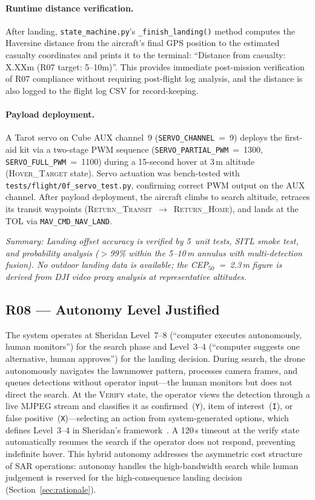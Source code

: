 \paragraph{Runtime distance verification.} After landing, \texttt{state\_machine.py}'s \texttt{\_finish\_landing()} method computes the Haversine distance from the aircraft's final GPS position to the estimated casualty coordinates and prints it to the terminal: ``Distance from casualty: X.XXm (R07 target: 5--10m)''. This provides immediate post-mission verification of R07 compliance without requiring post-flight log analysis, and the distance is also logged to the flight log CSV for record-keeping.

\paragraph{Payload deployment.} A Tarot servo on Cube AUX channel~9 (\texttt{SERVO\_CHANNEL}~=~9) deploys the first-aid kit via a two-stage PWM sequence (\texttt{SERVO\_PARTIAL\_PWM}~=~1300, \texttt{SERVO\_FULL\_PWM}~=~1100) during a 15-second hover at 3\,m altitude (\textsc{Hover\_Target} state). Servo actuation was bench-tested with \texttt{tests/flight/0f\_servo\_test.py}, confirming correct PWM output on the AUX channel. After payload deployment, the aircraft climbs to search altitude, retraces its transit waypoints (\textsc{Return\_Transit}~$\rightarrow$~\textsc{Return\_Home}), and lands at the TOL via \texttt{MAV\_CMD\_NAV\_LAND}.

\noindent\textit{Summary: Landing offset accuracy is verified by 5~unit tests, SITL smoke test, and probability analysis ($>$99\% within the 5--10\,m annulus with multi-detection fusion). No outdoor landing data is available; the CEP$_{50}$~=~2.3\,m figure is derived from DJI video proxy analysis at representative altitudes.}

\subsection{R08 --- Autonomy Level Justified}

The system operates at Sheridan Level~7--8 (``computer executes autonomously, human monitors'') for the search phase and Level~3--4 (``computer suggests one alternative, human approves'') for the landing decision. During search, the drone autonomously navigates the lawnmower pattern, processes camera frames, and queues detections without operator input---the human monitors but does not direct the search. At the \textsc{Verify} state, the operator views the detection through a live MJPEG stream and classifies it as confirmed~(\texttt{Y}), item of interest~(\texttt{I}), or false positive~(\texttt{X})---selecting an action from system-generated options, which defines Level~3--4 in Sheridan's framework~\cite{sheridan2002humans}. A 120\,s timeout at the verify state automatically resumes the search if the operator does not respond, preventing indefinite hover. This hybrid autonomy addresses the asymmetric cost structure of SAR operations: autonomy handles the high-bandwidth search while human judgement is reserved for the high-consequence landing decision (Section~\ref{sec:rationale}).

